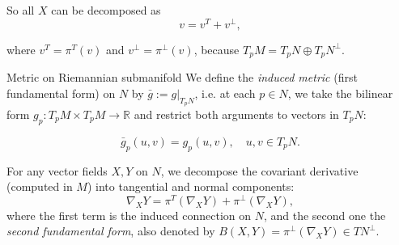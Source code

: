 So all $X$ can be decomposed as 
$$v = v^T + v^\perp,$$

where $v^T = \pi^T(v)$ and $v^\perp = \pi^\perp(v)$, because $T_pM = T_pN \oplus T_pN^\perp$.

\begin{colordef}{Metric on Riemannian submanifold}{}
We define the \emph{induced metric} (first fundamental form) on $N$ by $\bar g := g|_{T_pN}$, i.e. at each $p\in N$, we take the bilinear form $g_p: T_pM \times T_pM \to \mathbb{R}$ and restrict both arguments to vectors in $T_pN$:

\[
\bar{g}_p(u,v) = g_p(u,v), \quad u,v \in T_pN.
\]
\end{colordef}



For any vector fields $X, Y$ on $N$, we decompose the covariant derivative (computed in $M$) into tangential and normal components:
$$\nabla_X Y = \pi^T(\nabla_X Y) + \pi^\perp(\nabla_X Y),$$
where the first term is the induced connection on $N$, and the second one the \emph{second fundamental form}, also denoted by $B(X,Y)=\pi^\perp(\nabla_X Y)\in TN^\perp$.


